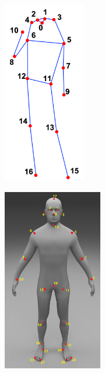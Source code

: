 \begin{figure}[htb]
    \centering
    \begin{subfigure}[b]{0.2\textwidth}
        \centering

        \includegraphics[height=8cm]{obrazky-figures/coco_landmarks.png}
        \label{fig:image1}
    \end{subfigure}
    \hfill
    \begin{subfigure}[b]{0.25\textwidth}
        \centering

        \includegraphics[height=8cm]{obrazky-figures/halpe_landmarks.jpg}
        \label{fig:image2}
    \end{subfigure}
    \hfill
    \begin{subfigure}[b]{0.5\textwidth}
        \centering


\end{subfigure}
\end{figure}
